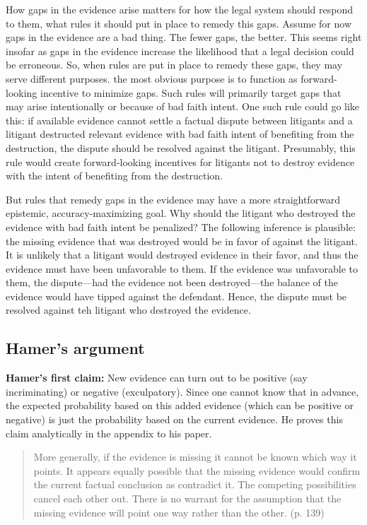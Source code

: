 \documentclass[
  10pt,
  dvipsnames,enabledeprecatedfontcommands]{scrartcl}
\begin{document}
How gaps in the evidence arise matters for how the legal system should
respond to them, what rules it should put in place to remedy this gaps.
Assume for now gaps in the evidence are a bad thing. The fewer gaps, the
better. This seems right insofar as gaps in the evidence increase the
likelihood that a legal decision could be erroneous. So, when rules are
put in place to remedy these gaps, they may serve different purposes.
the most obvious purpose is to function as forward-looking incentive to
minimize gaps. Such rules will primarily target gaps that may arise
intentionally or because of bad faith intent. One such rule could go
like this: if available evidence cannot settle a factual dispute between
litigants and a litigant destructed relevant evidence with bad faith
intent of benefiting from the destruction, the dispute should be
resolved against the litigant. Presumably, this rule would create
forward-looking incentives for litigants not to destroy evidence with
the intent of benefiting from the destruction.

But rules that remedy gaps in the evidence may have a more
straightforward epistemic, accuracy-maximizing goal. Why should the
litigant who destroyed the evidence with bad faith intent be penalized?
The following inference is plausible: the missing evidence that was
destroyed would be in favor of against the litigant. It is unlikely that
a litigant would destroyed evidence in their favor, and thus the
evidence must have been unfavorable to them. If the evidence was
unfavorable to them, the dispute---had the evidence not been
destroyed---the balance of the evidence would have tipped against the
defendant. Hence, the dispute must be resolved against teh litigant who
destroyed the evidence.

\hypertarget{hamers-argument}{%
\subsection{Hamer's argument}\label{hamers-argument}}

\textbf{Hamer's first claim:} New evidence can turn out to be positive
(say incriminating) or negative (exculpatory). Since one cannot know
that in advance, the expected probability based on this added evidence
(which can be positive or negative) is just the probability based on the
current evidence. He proves this claim analytically in the appendix to
his paper.

\begin{quote}
More generally, if the evidence is missing it cannot be known which way it points.
It appears equally possible that the missing evidence would confirm the current factual conclusion as
contradict it. The competing possibilities cancel each other out. There is no warrant for the assumption
that the missing evidence will point one way rather than the other. (p. 139)
\end{quote}
\end{document}
